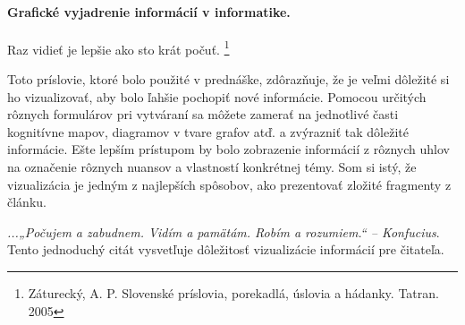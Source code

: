 \documentclass[10pt,twoside,slovak,a4paper]{article}
\begin{document}
\paragraph{Grafické vyjadrenie informácií v informatike.} \label{Grafické vyjadrenie}

Raz vidieť je lepšie ako sto krát počuť. \footnote{Záturecký, A. P. Slovenské príslovia, porekadlá, úslovia a hádanky. Tatran. 2005}

Toto príslovie, ktoré bolo použité v prednáške\cite{Vizualizacia}, zdôrazňuje, že je veľmi dôležité si ho vizualizovať, aby bolo ľahšie pochopiť nové informácie. 
Pomocou určitých rôznych formulárov pri vytváraní sa môžete zamerať na jednotlivé časti kognitívne mapov, diagramov v tvare grafov atď. a zvýrazniť tak dôležité informácie.
Ešte lepším prístupom by bolo zobrazenie informácií z rôznych uhlov na označenie rôznych nuansov a vlastností konkrétnej témy.
Som si istý, že vizualizácia je jedným z najlepších spôsobov, ako prezentovať zložité fragmenty z článku.

\textit{...„Počujem a zabudnem. Vidím a pamätám. Robím a rozumiem.“ – Konfucius}\cite{Vizualizacia}. Tento jednoduchý citát vysvetľuje dôležitosť vizualizácie informácií pre čitateľa.




\end{document}
